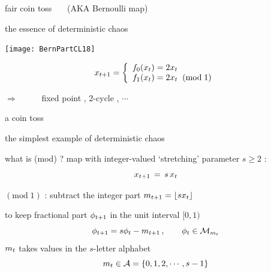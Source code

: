 \renewcommand{\statesp}{state space}
\renewcommand{\ssp}{\ensuremath{x}}               %

\begin{frame}{fair coin toss ~~~(AKA  {Bernoulli}  map)}
    \begin{block}{the essence of deterministic chaos}
\begin{center}
            \begin{minipage}[c]{0.36\textwidth}\begin{center}
\texttt{[image: BernPartCL18]}
            \end{center}\end{minipage}
            \hspace{2ex}
            \begin{minipage}[c]{0.46\textwidth}\begin{center}
\[
\ssp_{\zeit+1} =
\left\{ \begin{array}{l} %
        f_0(\ssp_{\zeit}) =  2 \ssp_{\zeit}
                             \\%
        f_1(\ssp_{\zeit}) =  2 \ssp_{\zeit} \;\; (\mbox{mod}\;1)
         \end{array}\right.
\]
            \end{center}\end{minipage}
\end{center}

\hfill $\Rightarrow$~~~~~
fixed point , 2-cycle , $\cdots$
    \end{block}

\bigskip

a 
{coin toss}

\hfill the simplest example of deterministic chaos
\end{frame}

\begin{frame}{what is ({mod}) ?}
map with integer-valued `stretching' parameter $s\geq2$ :
\[
\ssp_{\zeit+1} \,=\, {s}\,\ssp_{\zeit}
\] %

$(\mbox{mod}\;1)$ :
subtract the integer part
\(
\Ssym{\zeit+1}=\left\lfloor{s}\ssp_{\zeit}\right\rfloor
\)

\renewcommand{\ssp}{\ensuremath{\phi}}             %
to keep fractional part
$\ssp_{\zeit+1}$ in the unit interval $[0,1)$
\[
\ssp_{\zeit+1}
= {s} \ssp_{\zeit} - \Ssym{\zeit+1}
\,,\qquad  \ssp_{\zeit}\in\pS_{\Ssym{\zeit}}
\] %
${m_{t}}$ takes values in the ${s}$-letter alphabet
\[
{m_{t}} \in \mathcal{A}=\{0,1,2,\cdots,s-1\}
\] %
\end{frame}

